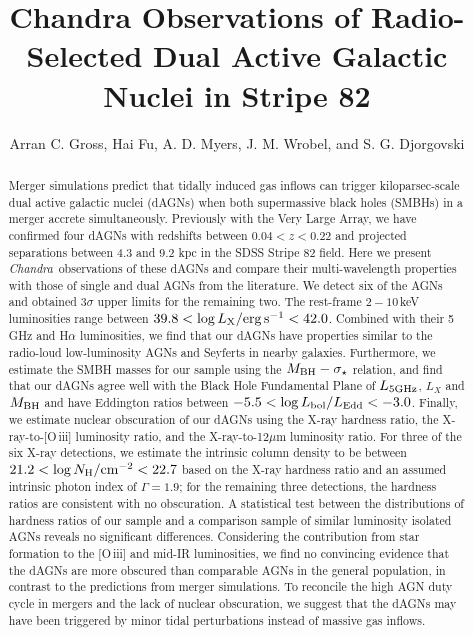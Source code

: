 \documentclass[iop,revtex4,twocolumn,apj,numberedappendix,appendixfloats]{emulateapj}
\newcommand{\chandra}{{\it Chandra}}
\begin{document}
\title{Chandra Observations of Radio-Selected Dual Active Galactic Nuclei in Stripe 82}

\author{
Arran C. Gross, 
Hai Fu, 
A. D. Myers,
J. M. Wrobel, and
S. G. Djorgovski
}

\begin{abstract}
Merger simulations predict that tidally induced gas inflows can trigger kiloparsec-scale dual active galactic nuclei (dAGNs) when both supermassive black holes (SMBHs) in a merger accrete simultaneously. Previously with the Very Large Array, we have confirmed four dAGNs with redshifts between $0.04 < z < 0.22$ and projected separations between 4.3 and 9.2 kpc in the SDSS Stripe 82 field. Here we present \chandra\, observations of these dAGNs and compare their multi-wavelength properties with those of single and dual AGNs from the literature. We detect six of the AGNs and obtained 3$\sigma$ upper limits for the remaining two. The rest-frame $2-10$\,keV luminosities range between $39.8 < \log L_{\rm X}/{\rm erg\,s^{-1}} < 42.0$. Combined with their 5\,GHz and H$\alpha$ luminosities, we find that our dAGNs have properties similar to the radio-loud low-luminosity AGNs and Seyferts in nearby galaxies. Furthermore, we estimate the SMBH masses for our sample using the $M_{\rm BH}-\sigma_\star$ relation, and find that our dAGNs agree well with the Black Hole Fundamental Plane of $L_{\rm 5GHz}$, $L_X$ and $M_{\rm BH}$ and have Eddington ratios between $-5.5 < \log L_{\rm bol}/L_{\rm Edd} < -3.0$. Finally, we estimate nuclear obscuration of our dAGNs using the X-ray hardness ratio, the X-ray-to-[O\,{\sc iii}] luminosity ratio, and the X-ray-to-12$\mu$m luminosity ratio. For three of the six X-ray detections, we estimate the intrinsic column density to be between $21.2 < \log N_{\rm H}/{\rm cm^{-2}} < 22.7$ based on the X-ray hardness ratio and an assumed intrinsic photon index of $\Gamma = 1.9$; for the remaining three detections, the hardness ratios are consistent with no obscuration. A statistical test between the distributions of hardness ratios of our sample and a comparison sample of similar luminosity isolated AGNs reveals no significant differences. Considering the  contribution from star formation to the [O\,{\sc iii}] and mid-IR luminosities, we find no convincing evidence that the dAGNs are more obscured than comparable AGNs in the general population, in contrast to the predictions from merger simulations. To reconcile the high AGN duty cycle in mergers and the lack of nuclear obscuration, we suggest that the dAGNs may have been triggered by minor tidal perturbations instead of massive gas inflows. 
\end{abstract}
\end{document}
